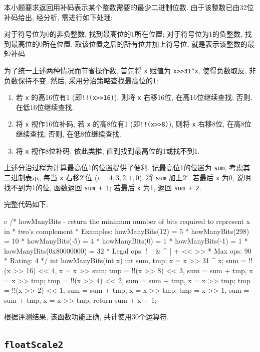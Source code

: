 本小题要求返回用补码表示某个整数需要的最少二进制位数. 由于该整数已由32位补码给出, 经分析, 需进行如下处理: 

对于符号位为0的非负整数, 找到最高位的1所在位置; 对于符号位为1的负整数, 找到最高位的0所在位置. 取该位置之后的所有位并加上符号位, 就是表示该整数的最短补码.

为了统一上述两种情况而节省操作数, 首先将 \verb|x| 赋值为 \verb|x>>31^x|, 使得负数取反, 非负数保持不变. 然后, 采用分治策略查找最高位的1: 

\begin{enumerate}[noitemsep]
    \item 若 \verb|x| 的高16位有1 (即\verb|!!(x>>16)|), 则将 \verb|x| 右移16位, 在高16位继续查找; 否则, 在低16位继续查找. 
    \item 将 \verb|x| 视作16位补码, 若 \verb|x| 的高8位有1 (即\verb|!!(x>>8)|), 则将 \verb|x| 右移8位, 在高8位继续查找; 否则, 在低8位继续查找. 
    \item 将 \verb|x| 视作8位补码, 依此类推, 直到找到最高位的1或找不到1.
\end{enumerate}

上述分治过程为计算最高位1的位置提供了便利. 记最高位1的位置为  \verb|sum|, 考虑其二进制表示, 每当 \verb|x| 右移$2^i$位 ($i=4,3,2,1,0$), 将 \verb|sum| 加上$2^i$. 若最后 \verb|x| 为0, 说明找不到为1的位, 函数返回 \verb|sum + 1|; 若最后 \verb|x| 为1, 返回  \verb|sum + 2|.

完整代码如下:  

\begin{code}{c}
/* howManyBits - return the minimum number of bits required to represent x in
 *             two's complement
 *  Examples: howManyBits(12) = 5
 *            howManyBits(298) = 10
 *            howManyBits(-5) = 4
 *            howManyBits(0)  = 1
 *            howManyBits(-1) = 1
 *            howManyBits(0x80000000) = 32
 *  Legal ops: ! ~ & ^ | + << >>
 *  Max ops: 90
 *  Rating: 4
 */
int howManyBits(int x) {
  int sum, tmp;
  x = x >> 31 ^ x;
  sum = !!(x >> 16) << 4, x = x >> sum;
  tmp = !!(x >> 8) << 3, sum = sum + tmp, x = x >> tmp;
  tmp = !!(x >> 4) << 2, sum = sum + tmp, x = x >> tmp;
  tmp = !!(x >> 2) << 1, sum = sum + tmp, x = x >> tmp;
  tmp = x >> 1, sum = sum + tmp, x = x >> tmp;
  return sum + x + 1;
}
\end{code}

根据评测结果, 该函数功能正确, 共计使用30个运算符.

\subsection{\texttt{floatScale2}}

